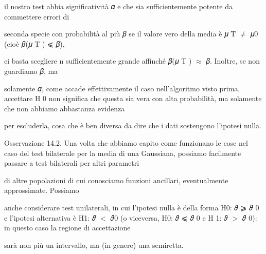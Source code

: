 \documentclass[a4paper,portrait,12pt]{article}
\begin{document}
\begin{flushleft}
il nostro test abbia significativit\`{a} 𝛼 e che sia sufficientemente potente da commettere errori di
\end{flushleft}


\begin{flushleft}
seconda specie con probabilit\`{a} al più 𝛽 se il valore vero della media \`{e} 𝜇 T $\neq$ 𝜇0 (cio\`{e} 𝛽(𝜇 T ) ⩽ 𝛽),
\end{flushleft}


\begin{flushleft}
ci basta scegliere n sufficientemente grande affinch\'{e} 𝛽(𝜇 T ) $\approx$ 𝛽. Inoltre, se non guardiamo 𝛽, ma
\end{flushleft}


\begin{flushleft}
solamente 𝛼, come accade effettivamente il caso nell'algoritmo visto prima, accettare H 0 non significa che questa sia vera con alta probabilit\`{a}, ma solamente che non abbiamo abbastanza evidenza
\end{flushleft}


\begin{flushleft}
per escluderla, cosa che \`{e} ben diversa da dire che i dati sostengono l'ipotesi nulla.
\end{flushleft}


\begin{flushleft}
Osservazione 14.2. Una volta che abbiamo capito come funzionano le cose nel caso del test bilaterale per la media di una Gaussiana, possiamo facilmente passare a test bilaterali per altri parametri
\end{flushleft}


\begin{flushleft}
di altre popolazioni di cui conosciamo funzioni ancillari, eventualmente approssimate. Possiamo
\end{flushleft}


\begin{flushleft}
anche considerare test unilaterali, in cui l'ipotesi nulla \`{e} della forma H0: 𝜗 ⩾ 𝜗 0 e l'ipotesi alternativa \`{e} H1: 𝜗 $<$ 𝜗0 (o viceversa, H0: 𝜗 ⩽ 𝜗 0 e H 1: 𝜗 $>$ 𝜗 0): in questo caso la regione di accettazione
\end{flushleft}


\begin{flushleft}
sar\`{a} non più un intervallo, ma (in genere) una semiretta.
\end{flushleft}
\end{document}
